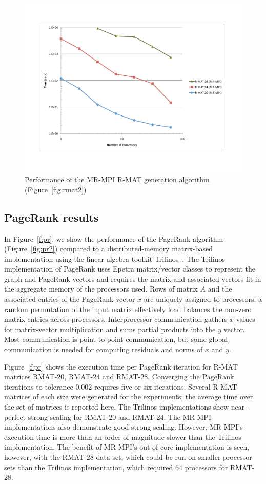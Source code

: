 \begin{figure}[htb]
\includegraphics[width=\textwidth]{fig_rmat.pdf}
\caption{Performance of the MR-MPI R-MAT generation algorithm (Figure~\ref{fig:rmat2}) 
}
\label{f:rmat}
\end{figure}

\subsection{PageRank results}
\label{subsec:results_pagerank}

In Figure~\ref{f:pr}, we show the performance of the PageRank
algorithm (Figure~\ref{fig:pr2}) compared to a distributed-memory
matrix-based implementation using the linear algebra toolkit
Trilinos~\cite{Trilinos-Overview}.  The Trilinos implementation of
PageRank uses Epetra matrix/vector classes to represent the graph and
PageRank vectors and requires the matrix and associated vectors fit in
the aggregate memory of the processors used.  Rows of matrix $A$ and
the associated entries of the PageRank vector $x$ are uniquely
assigned to processors; a random permutation of the input matrix
effectively load balances the non-zero matrix entries across
processors.  Interprocessor communication gathers $x$ values for
matrix-vector multiplication and sums partial products into the $y$
vector.  Most communication is point-to-point communication, but some
global communication is needed for computing residuals and norms of
$x$ and $y$.

Figure~\ref{f:pr} shows the execution time per PageRank iteration for
R-MAT matrices RMAT-20, RMAT-24 and RMAT-28.  Converging the PageRank
iterations to tolerance $0.002$ requires five or six iterations.
Several R-MAT matrices of each size were generated for the
experiments; the average time over the set of matrices is reported
here.  The Trilinos implementations show near-perfect strong scaling
for RMAT-20 and RMAT-24.  The MR-MPI implementations also demonstrate
good strong scaling.  However, MR-MPI's execution time is more than an
order of magnitude slower than the Trilinos implementation.  The
benefit of MR-MPI's out-of-core implementation is seen, however, with
the RMAT-28 data set, which could be run on smaller processor sets
than the Trilinos implementation, which required 64 processors for
RMAT-28.

